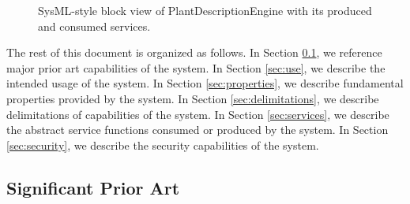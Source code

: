 \documentclass[a4paper]{arrowhead}
\begin{document}
\begin{figure}[ht!]
  \centering
  \caption{SysML-style block view of PlantDescriptionEngine with its produced and consumed services.}
  \label{fig:system}
\end{figure}

The rest of this document is organized as follows.
In Section \ref{sec:prior_art}, we reference major prior art capabilities of the system.
In Section \ref{sec:use}, we describe the intended usage of the system.
In Section \ref{sec:properties}, we describe fundamental properties provided by the system.
In Section \ref{sec:delimitations}, we describe delimitations of capabilities of the system.
In Section \ref{sec:services}, we describe the abstract service functions consumed or produced by the system.
In Section \ref{sec:security}, we describe the security capabilities of the system.

\newpage

\subsection{Significant Prior Art}
\label{sec:prior_art}
\end{document}
